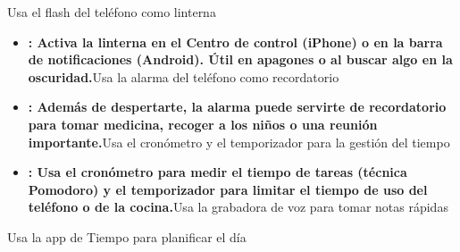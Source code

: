 


Usa el flash del teléfono como linterna

\begin{itemize}
  \item \textbf{: Activa la linterna en el Centro de control (iPhone) o en la barra de notificaciones (Android). Útil en apagones o al buscar algo en la oscuridad.}Usa la alarma del teléfono como recordatorio
  \item \textbf{: Además de despertarte, la alarma puede servirte de recordatorio para tomar medicina, recoger a los niños o una reunión importante.}Usa el cronómetro y el temporizador para la gestión del tiempo
  \item \textbf{: Usa el cronómetro para medir el tiempo de tareas (técnica Pomodoro) y el temporizador para limitar el tiempo de uso del teléfono o de la cocina.}Usa la grabadora de voz para tomar notas rápidas
\end{itemize}


Usa la app de Tiempo para planificar el día


